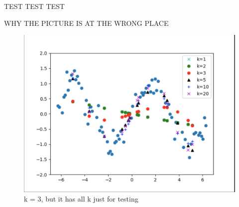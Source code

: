\begin{answer}
TEST TEST TEST

WHY THE PICTURE IS AT THE WRONG PLACE
\begin{figure}
    \centering
    \includegraphics[width=0.5\linewidth]{Screenshot 2024-01-16 at 22.32.55.png}
    \caption{k = 3, but it has all k just for testing}
    \label{fig:enter-label}
\end{figure}
\end{answer}
